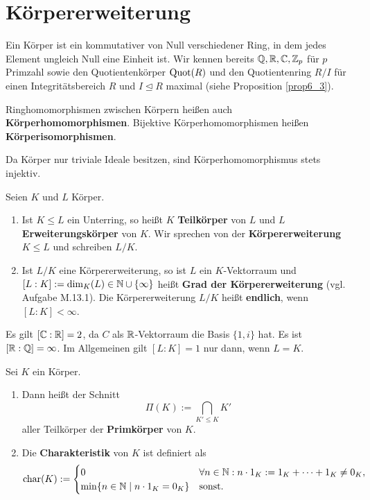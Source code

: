 \section{Körpererweiterung}
Ein Körper ist ein kommutativer von Null verschiedener Ring, in dem jedes Element ungleich Null eine Einheit ist. Wir kennen bereits $\mathbb{Q}, \mathbb{R}, \mathbb{C}, \mathbb{Z}_p$ für $p$ Primzahl sowie den Quotientenkörper $\mathrm{Quot}(R)$ und den Quotientenring $R/I$ für einen Integritätsbereich $R$ und $I \unlhd R$ maximal (siehe Proposition \ref{prop6_3}).

Ringhomomorphismen zwischen Körpern heißen auch \textbf{Körperhomomorphismen}. Bijektive Körperhomomorphismen heißen \textbf{Körperisomorphismen}.

Da Körper nur triviale Ideale besitzen, sind Körperhomomorphismus stets injektiv.
\begin{definition}
	Seien $K$ und $L$ Körper. 
	\begin{enumerate}[label=(\alph*)]
		\item Ist $K \leq L$ ein Unterring, so heißt $K$ \textbf{Teilkörper} von $L$ und $L$ \textbf{Erweiterungskörper} von $K$. Wir sprechen von der \textbf{Körpererweiterung} $K \leq L$ und schreiben $L / K$.
		\item Ist $L/K$ eine Körpererweiterung, so ist $L$ ein $K$-Vektorraum und $[L:K] := \dim_K(L) \in \mathbb{N} \cup \{\infty\}$ heißt \textbf{Grad der Körpererweiterung} (vgl. Aufgabe M.13.1).  Die Körpererweiterung $L/K$ heißt \textbf{endlich}, wenn $[L:K] < \infty$.
	\end{enumerate}
\end{definition}
\begin{beispiel}\label{beispiel7_2}
	Es gilt $[\mathbb{C} : \mathbb{R}] = 2$, da $C$ als $\mathbb{R}$-Vektorraum die Basis $\{1,i\}$ hat. Es ist $[\mathbb{R} : \mathbb{Q}] = \infty$. Im Allgemeinen gilt $[L : K] = 1$ nur dann, wenn $L = K$. 
\end{beispiel}
\begin{definition}
	Sei $K$ ein Körper. 
	\begin{enumerate}[label=(\alph*)]
		\item Dann heißt der Schnitt
		\[\Pi(K) := \bigcap_{K' \leq K} K'\]
		aller Teilkörper der \textbf{Primkörper} von $K$.
		\item Die \textbf{Charakteristik} von $K$ ist definiert als
		\[\mathrm{char}(K) := \begin{cases}
			0 & \forall n \in \mathbb{N} : n \cdot 1_K := 1_K + \dots + 1_K \neq 0_K,\\
			\min\{n \in \mathbb{N} \mid n \cdot 1_K = 0_K\} & \text{sonst.}
		\end{cases}\]
	\end{enumerate}
\end{definition}
